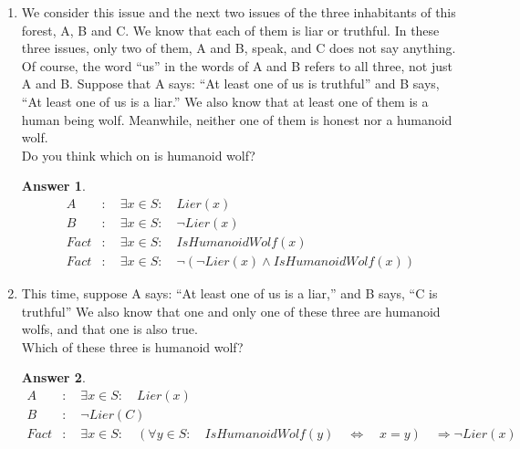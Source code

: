 \documentclass[a4paper]{article}
\renewcommand{\(}{\left(}
\renewcommand{\)}{\right)}
\theoremstyle{plain}
\theoremstyle{plain}
\theoremstyle{definition}
\newtheorem*{answer}{Answer}
\begin{document}
\begin{enumerate}[label*=\alph*.,ref=\alph*]
\item We consider this issue and the next two issues of the three inhabitants of this forest, A, B and C. We know that each of them is liar or truthful. In these three issues, only two of them, A and B, speak, and C does not say anything. Of course, the word ``us'' in the words of A and B refers to all three, not just A and B. Suppose that A says: ``At least one of us is truthful'' and B says, ``At least one of us is a liar.'' We also know that at least one of them is a human being wolf. Meanwhile, neither one of them is honest nor a humanoid wolf. \\
Do you think which on is humanoid wolf?
\begin{shaded}
\begin{answer}
\begin{align*}
  A  &: \quad \exists x \in S : \quad Lier(x) \\
  B &: \quad \exists x \in S : \quad \neg Lier(x) \\
  Fact &: \quad \exists x \in S : \quad IsHumanoidWolf(x) \\
  Fact &: \quad \exists x \in S : \quad \neg (\neg Lier(x) \wedge IsHumanoidWolf(x))
\end{align*}
\end{answer}
\end{shaded}

\item This time, suppose A says: ``At least one of us is a liar,'' and B says, ``C is truthful''
We also know that one and only one of these three are humanoid wolfs, and that one is also true.\\
 Which of these three is humanoid wolf?
\begin{shaded}
\begin{answer}
\begin{align*}
  A &: \quad \exists x \in S : \quad Lier(x) \\
  B &: \quad \neg Lier(C) \\
  Fact &: \quad \exists x \in S : \quad (\forall y \in S : \quad IsHumanoidWolf(y) \quad \Leftrightarrow \quad x = y) \quad \Rightarrow \neg Lier(x) \\
\end{align*}
\end{answer}
\end{shaded}


\end{enumerate}
\end{document}
